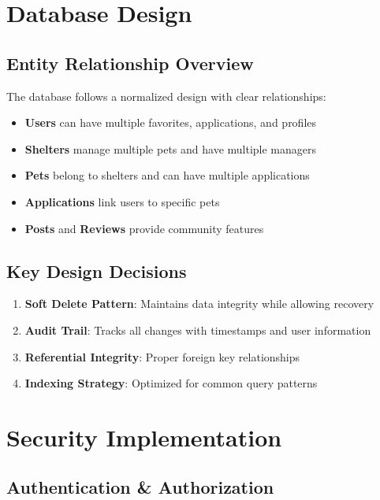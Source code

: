 \documentclass[12pt,a4paper]{article}
\begin{document}
\section{Database Design}

\subsection{Entity Relationship Overview}

The database follows a normalized design with clear relationships:

\begin{itemize}
    \item \textbf{Users} can have multiple favorites, applications, and profiles
    \item \textbf{Shelters} manage multiple pets and have multiple managers
    \item \textbf{Pets} belong to shelters and can have multiple applications
    \item \textbf{Applications} link users to specific pets
    \item \textbf{Posts} and \textbf{Reviews} provide community features
\end{itemize}

\subsection{Key Design Decisions}

\begin{enumerate}
    \item \textbf{Soft Delete Pattern}: Maintains data integrity while allowing recovery
    \item \textbf{Audit Trail}: Tracks all changes with timestamps and user information
    \item \textbf{Referential Integrity}: Proper foreign key relationships
    \item \textbf{Indexing Strategy}: Optimized for common query patterns
\end{enumerate}

\section{Security Implementation}

\subsection{Authentication \& Authorization}
\end{document}
